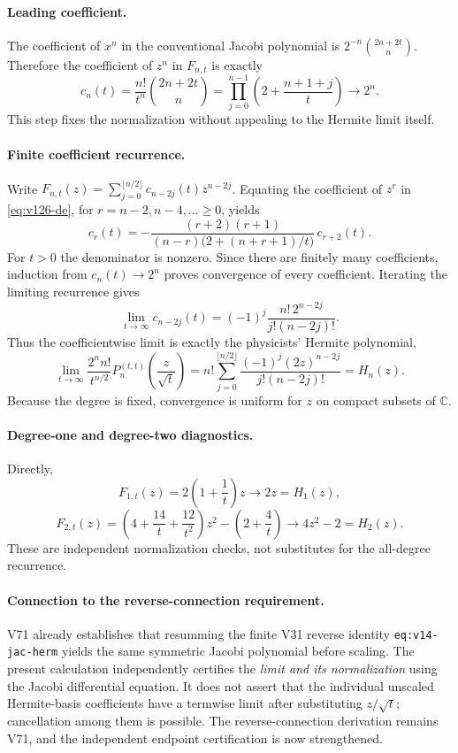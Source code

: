 \documentclass[11pt]{article}
\begin{document}
\paragraph{Leading coefficient.} The coefficient of $x^n$ in the conventional Jacobi polynomial is $2^{-n}\binom{2n+2t}{n}$. Therefore the coefficient of $z^n$ in $F_{n,t}$ is exactly
\[
 c_n(t)=\frac{n!}{t^n}\binom{2n+2t}{n}
 =\prod_{j=0}^{n-1}\left(2+\frac{n+1+j}{t}\right)
 \longrightarrow 2^n.
\]
This step fixes the normalization without appealing to the Hermite limit itself.

\paragraph{Finite coefficient recurrence.} Write $F_{n,t}(z)=\sum_{j=0}^{\lfloor n/2\rfloor}c_{n-2j}(t)z^{n-2j}$. Equating the coefficient of $z^r$ in \eqref{eq:v126-de}, for $r=n-2,n-4,\ldots\ge0$, yields
\begin{equation}\label{eq:v126-rec}
 \boxed{c_r(t)=-\frac{(r+2)(r+1)}{(n-r)\bigl(2+(n+r+1)/t\bigr)}\,c_{r+2}(t).}
\end{equation}
For $t>0$ the denominator is nonzero. Since there are finitely many coefficients, induction from $c_n(t)\to2^n$ proves convergence of every coefficient. Iterating the limiting recurrence gives
\[
 \boxed{\lim_{t\to\infty}c_{n-2j}(t)
 =(-1)^j\frac{n!\,2^{n-2j}}{j!(n-2j)!}.}
\]
Thus the coefficientwise limit is exactly the physicists' Hermite polynomial,
\begin{equation}\label{eq:v126-limit}
 \boxed{\lim_{t\to\infty}\frac{2^n n!}{t^{n/2}}P_n^{(t,t)}\!\left(\frac z{\sqrt t}\right)
 =n!\sum_{j=0}^{\lfloor n/2\rfloor}\frac{(-1)^j(2z)^{n-2j}}{j!(n-2j)!}=H_n(z).}
\end{equation}
Because the degree is fixed, convergence is uniform for $z$ on compact subsets of $\mathbb C$.

\paragraph{Degree-one and degree-two diagnostics.} Directly,
\[
 F_{1,t}(z)=2\left(1+\frac1t\right)z\to2z=H_1(z),
\]
\[
 F_{2,t}(z)=\left(4+\frac{14}t+\frac{12}{t^2}\right)z^2-\left(2+\frac4t\right)
 \to4z^2-2=H_2(z).
\]
These are independent normalization checks, not substitutes for the all-degree recurrence.

\paragraph{Connection to the reverse-connection requirement.} V71 already establishes that resumming the finite V31 reverse identity \texttt{eq:v14-jac-herm} yields the same symmetric Jacobi polynomial before scaling. The present calculation independently certifies the \emph{limit and its normalization} using the Jacobi differential equation. It does not assert that the individual unscaled Hermite-basis coefficients have a termwise limit after substituting $z/\sqrt t$; cancellation among them is possible. The reverse-connection derivation remains V71, and the independent endpoint certification is now strengthened.
\end{document}
